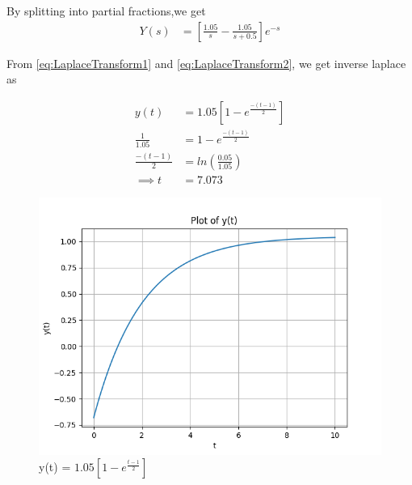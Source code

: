 \documentclass[journal,12pt,twocolumn]{IEEEtran}
\theoremstyle{remark}
\begin{document}
By splitting into partial fractions,we get
\begin{align}
    Y(s) &= [\frac{1.05}{s} - \frac{1.05}{s+0.5}]e^{-s}
\end{align}

From \eqref{eq:LaplaceTransform1} and \eqref{eq:LaplaceTransform2}, we get inverse laplace as 

\begin{align}
    y(t) &= 1.05[1-e^{\frac{-(t-1)}{2}}] \\
    \frac{1}{1.05} &= 1-e^{\frac{-(t-1)}{2}} \\
    \frac{-(t-1)}{2} &= ln(\frac{0.05}{1.05}) \\
    \implies t &= 7.073 
\end{align}

\begin{figure}[h]
    \centering
    \includegraphics[width=\columnwidth]{figs/fig1.png}
    \caption{y(t) = $1.05[1-e^{\frac{t-1}{2}}]$}
    \label{fig:gate23ch62}
\end{figure}
\end{document}
